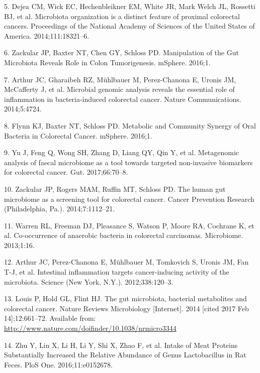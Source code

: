 \documentclass[12pt,]{article}
\begin{document}
\hypertarget{ref-dejea_microbiota_2014}{}
5. Dejea CM, Wick EC, Hechenbleikner EM, White JR, Mark Welch JL,
Rossetti BJ, et al. Microbiota organization is a distinct feature of
proximal colorectal cancers. Proceedings of the National Academy of
Sciences of the United States of America. 2014;111:18321--6.

\hypertarget{ref-zackular_manipulation_2016}{}
6. Zackular JP, Baxter NT, Chen GY, Schloss PD. Manipulation of the Gut
Microbiota Reveals Role in Colon Tumorigenesis. mSphere. 2016;1.

\hypertarget{ref-arthur_microbial_2014}{}
7. Arthur JC, Gharaibeh RZ, Mühlbauer M, Perez-Chanona E, Uronis JM,
McCafferty J, et al. Microbial genomic analysis reveals the essential
role of inflammation in bacteria-induced colorectal cancer. Nature
Communications. 2014;5:4724.

\hypertarget{ref-flynn_metabolic_2016}{}
8. Flynn KJ, Baxter NT, Schloss PD. Metabolic and Community Synergy of
Oral Bacteria in Colorectal Cancer. mSphere. 2016;1.

\hypertarget{ref-yu_metagenomic_2017}{}
9. Yu J, Feng Q, Wong SH, Zhang D, Liang QY, Qin Y, et al. Metagenomic
analysis of faecal microbiome as a tool towards targeted non-invasive
biomarkers for colorectal cancer. Gut. 2017;66:70--8.

\hypertarget{ref-zackular_human_2014}{}
10. Zackular JP, Rogers MAM, Ruffin MT, Schloss PD. The human gut
microbiome as a screening tool for colorectal cancer. Cancer Prevention
Research (Philadelphia, Pa.). 2014;7:1112--21.

\hypertarget{ref-warren_co-occurrence_2013}{}
11. Warren RL, Freeman DJ, Pleasance S, Watson P, Moore RA, Cochrane K,
et al. Co-occurrence of anaerobic bacteria in colorectal carcinomas.
Microbiome. 2013;1:16.

\hypertarget{ref-arthur_intestinal_2012}{}
12. Arthur JC, Perez-Chanona E, Mühlbauer M, Tomkovich S, Uronis JM, Fan
T-J, et al. Intestinal inflammation targets cancer-inducing activity of
the microbiota. Science (New York, N.Y.). 2012;338:120--3.

\hypertarget{ref-louis_gut_2014}{}
13. Louis P, Hold GL, Flint HJ. The gut microbiota, bacterial
metabolites and colorectal cancer. Nature Reviews Microbiology
{[}Internet{]}. 2014 {[}cited 2017 Feb 14{]};12:661--72. Available from:
\url{http://www.nature.com/doifinder/10.1038/nrmicro3344}

\hypertarget{ref-zhu_intake_2016}{}
14. Zhu Y, Lin X, Li H, Li Y, Shi X, Zhao F, et al. Intake of Meat
Proteins Substantially Increased the Relative Abundance of Genus
Lactobacillus in Rat Feces. PloS One. 2016;11:e0152678.
\end{document}
